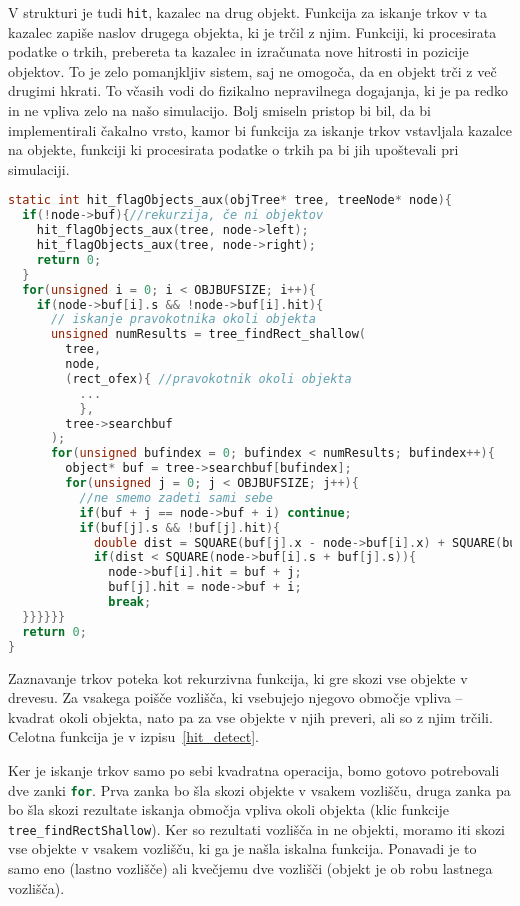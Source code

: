 \documentclass[a4paper,12pt]{article}
\begin{document}
V strukturi je tudi \lstinline|hit|, kazalec na drug objekt. Funkcija za iskanje trkov v ta kazalec zapiše naslov
drugega objekta, ki je trčil z njim. Funkciji, ki procesirata podatke o trkih, prebereta
ta kazalec in izračunata nove hitrosti in pozicije objektov. To je zelo pomanjkljiv sistem, saj ne omogoča,
da en objekt trči z več drugimi hkrati. To včasih vodi do fizikalno nepravilnega dogajanja, ki je pa redko
in ne vpliva zelo na našo simulacijo. Bolj smiseln pristop bi bil, da bi implementirali čakalno vrsto, kamor
bi funkcija za iskanje trkov vstavljala kazalce na objekte, funkciji ki procesirata podatke o trkih pa bi jih
upoštevali pri simulaciji.
\begin{lstlisting}[float, breaklines=true, postbreak=\mbox{\textcolor{purple}{$\hookrightarrow$}\space}, caption={Zaznava trkov}, label=hit_detect, language=C]
static int hit_flagObjects_aux(objTree* tree, treeNode* node){
  if(!node->buf){//rekurzija, če ni objektov
    hit_flagObjects_aux(tree, node->left);
    hit_flagObjects_aux(tree, node->right);
    return 0;
  }
  for(unsigned i = 0; i < OBJBUFSIZE; i++){
    if(node->buf[i].s && !node->buf[i].hit){      
      // iskanje pravokotnika okoli objekta
      unsigned numResults = tree_findRect_shallow(
        tree,
        node,
        (rect_ofex){ //pravokotnik okoli objekta
          ...
          },
        tree->searchbuf
      );
      for(unsigned bufindex = 0; bufindex < numResults; bufindex++){
        object* buf = tree->searchbuf[bufindex];
        for(unsigned j = 0; j < OBJBUFSIZE; j++){
          //ne smemo zadeti sami sebe
          if(buf + j == node->buf + i) continue; 
          if(buf[j].s && !buf[j].hit){
            double dist = SQUARE(buf[j].x - node->buf[i].x) + SQUARE(buf[j].y - node->buf[i].y);            
            if(dist < SQUARE(node->buf[i].s + buf[j].s)){
              node->buf[i].hit = buf + j;
              buf[j].hit = node->buf + i;
              break;
  }}}}}}
  return 0;
}
\end{lstlisting}

Zaznavanje trkov poteka kot rekurzivna funkcija, ki gre skozi vse objekte v drevesu. Za vsakega poišče vozlišča,
ki vsebujejo njegovo območje vpliva -- kvadrat okoli objekta, nato pa za vse objekte v njih preveri, ali so z njim
trčili. Celotna funkcija je v izpisu~\ref{hit_detect}.

Ker je iskanje trkov samo po sebi kvadratna operacija, bomo gotovo potrebovali dve zanki \lstinline[language=C]|for|.
Prva zanka bo šla skozi objekte v vsakem vozlišču, druga zanka pa bo šla skozi rezultate iskanja območja vpliva okoli
objekta (klic funkcije \lstinline|tree_findRectShallow|). Ker so rezultati vozlišča in ne objekti, moramo iti skozi vse
objekte v vsakem vozlišču, ki ga je našla iskalna funkcija. Ponavadi je to samo eno (lastno vozlišče) ali kvečjemu dve
vozlišči (objekt je ob robu lastnega vozlišča).
\end{document}
